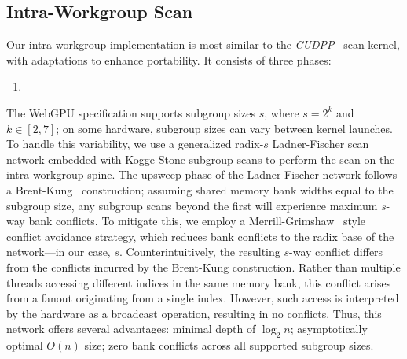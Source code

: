 \documentclass[sigconf]{acmart}
\begin{document}
\subsection{Intra-Workgroup Scan}
Our intra-workgroup implementation is most similar to the \emph{CUDPP}~\cite{} scan kernel, with adaptations to enhance portability. It consists of three phases:
\begin{enumerate}
  \item
\end{enumerate}

The WebGPU specification supports subgroup sizes $s$, where $s = 2^k$ and $k \in [2, 7]$; on some hardware, subgroup sizes can vary between kernel launches. To handle this variability, we use a generalized radix-$s$ Ladner-Fischer scan network embedded with Kogge-Stone subgroup scans to perform the scan on the intra-workgroup spine. The upsweep phase of the Ladner-Fischer network follows a Brent-Kung~\cite{1675982} construction; assuming shared memory bank widths equal to the subgroup size, any subgroup scans beyond the first will experience maximum $s$-way bank conflicts. To mitigate this, we employ a Merrill-Grimshaw~\cite[Section 3.3.5]{Merrill2009} style conflict avoidance strategy, which reduces bank conflicts to the radix base of the network—in our case, $s$. Counterintuitively, the resulting $s$-way conflict differs from the conflicts incurred by the Brent-Kung construction. Rather than multiple threads accessing different indices in the same memory bank, this conflict arises from a fanout originating from a single index. However, such access is interpreted by the hardware as a broadcast operation, resulting in no conflicts. Thus, this network offers several advantages: minimal depth of $\log_2 n$; asymptotically optimal $O(n)$ size; zero bank conflicts across all supported subgroup sizes.
\end{document}
